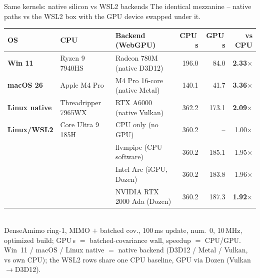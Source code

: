 \documentclass[aspectratio=169,11pt]{beamer}
\begin{document}
\begin{frame}{Same kernels: native silicon vs WSL2 backends}
  \centering
  {\footnotesize The \alert{identical} mezzanine -- native paths vs the \alert{WSL2}
   box with the GPU \alert{device} swapped under it.}
  \vspace{0.2em}

  {\footnotesize
  \setlength{\tabcolsep}{5pt}
  \renewcommand{\arraystretch}{0.92}
  \begin{tabular}{lll r r r}
    \toprule
    OS & CPU & Backend \scriptsize(WebGPU) & CPU\,s & GPU\,s & vs CPU\\
    \midrule
    \rowcolor{cpuCol!8}
    \textcolor{cpuCol}{\textbf{Win 11}} & Ryzen 9 7940HS & Radeon 780M \scriptsize(native D3D12) & 196.0 & 84.0 & \textbf{2.33$\times$}\\
    \rowcolor{gpuCol!8}
    \textcolor{gpuCol}{\textbf{macOS 26}} & Apple M4 Pro & M4 Pro 16-core \scriptsize(native Metal) & 140.1 & 41.7 & \textbf{3.36$\times$}\\
    \rowcolor{warnCol!12}
    \textcolor{warnCol}{\textbf{Linux native}} & Threadripper 7965WX & RTX A6000 \scriptsize(native Vulkan) & 362.2 & 173.1 & \textbf{2.09$\times$}\\
    \midrule
    \rowcolor{mezCol!10}
    \textcolor{mezCol}{\textbf{Linux/WSL2}} & Core Ultra 9 185H & CPU only \scriptsize(no GPU) & 360.2 & -- & 1.00$\times$\\
    \rowcolor{mezCol!10}
     &  & llvmpipe \scriptsize(CPU software) & 360.2 & 185.1 & 1.95$\times$\\
    \rowcolor{mezCol!10}
     &  & Intel Arc \scriptsize(iGPU, Dozen) & 360.2 & 183.8 & 1.96$\times$\\
    \rowcolor{mezCol!10}
     &  & NVIDIA RTX 2000 Ada \scriptsize(Dozen) & 360.2 & 187.3 & \textbf{1.92$\times$}\\
    \bottomrule
  \end{tabular}}
  \\[0.3em]
  {\tiny DenseAmimo ring-1, MIMO $+$ batched cov., 100\,ms update, num.~0, 10\,MHz,
   \alert{optimized} build; GPU\,s $=$ batched-covariance wall, speedup $=$ CPU/GPU.
   Win~11 / macOS / \alert{Linux native} $=$ native backend (D3D12 / Metal / Vulkan,
   vs own CPU); the WSL2 rows share one CPU baseline, GPU via \alert{Dozen}
   (Vulkan$\to$D3D12).}
\end{frame}
\end{document}
